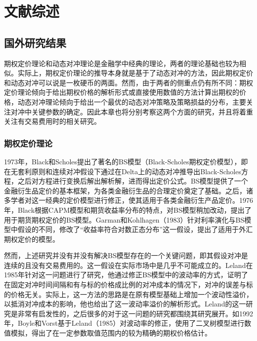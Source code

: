 
\chapter{文献综述}
\label{chap:bib}

\section{国外研究结果}

期权定价理论和动态对冲理论是金融学中经典的理论，两者的理论基础也较为相似。实际上，期权定价理论的推导本身就是基于了动态对冲的方法，因此期权定价和动态对冲可以说是一枚硬币的两面。然而，由于两者的侧重点仍有所不同：期权定价理论倾向于给出期权价格的解析形式或直接使用数值的方法计算出期权的价格，动态对冲理论倾向于给出一个最优的动态对冲策略及策略损益的分布，主要关注对冲中关键参数的确定。因此本章也将分别考察这两个方面的研究，并且将着重关注有交易费用时的相关研究。

\subsection{期权定价理论}

1973年，Black和Scholes\cite{black1973pricing}提出了著名的BS模型（Black-Scholes期权定价模型），即在无套利原则和连续对冲假设下通过在Delta上的动态对冲推导出Black-Scholes方程，之后对方程进行变换后解出解析解，进而得出定价公式。BS模型提供了一个金融衍生品定价的基本框架，为各类金融衍生品的合理定价奠定了基础。之后，诸多学者对这一经典的定价模型进行修正，使其适用于各类金融衍生产品定价。1976年，Black\cite{black1976pricing}根据CAPM模型和期货收益率分布的特点，对BS模型稍加改动，提出了用于期货期权定价的BS模型。Garman和Kohlhagen（1983）\cite{garman1983foreign}针对利率演化与BS模型中假设的不同，修改了“收益率符合对数正态分布”这一假设，提出了适用于外汇期权定价的模型。

然而，上述研究并没有并没有解决BS模型存在的一个关键问题，即其假设对冲是连续的且没有交易费用的。这一假设在实际市场中是几乎不可能成立的。Leland\cite{leland1985option}在1985年针对这一问题进行了研究，他通过修正BS模型中的波动率的方式，证明了在固定对冲时间间隔和有与标的价格成比例的对冲成本的情况下，对冲的误差与标的价格无关。实际上，这一方法的思路是在原有模型基础上增加一个波动性溢价，以抵消对冲成本的影响，他也给出了这一波动率溢价的解析形式。Leland的这一研究是非常有启发性的，之后很多的对于这一问题的研究都围绕其研究展开。如1992年，Boyle和Vorst\cite{boyle1992option}基于Leland（1985）\cite{leland1985option}对波动率的修正，使用了二叉树模型进行数值模拟，得出了在一定参数取值范围内的较为精确的期权价格估计。

